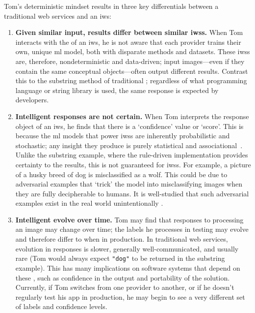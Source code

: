 Tom's deterministic mindset results in three key differentials between a traditional web services and an \gls{iws}:
\begin{enumerate}[label=\textbf{(\arabic*)}]
    \item \textbf{Given similar input, results differ between similar \glspl{iws}.}
    When Tom interacts with the  of an \gls{iws}, he is not aware that each  provider trains their own, unique \gls{ml} model, both with disparate methods and datasets. These \glspl{iws} are, therefore, nondeterministic and data-driven; input images---even if they contain the same conceptual objects---often output different results. Contrast this to the substring method of traditional ; regardless of what programming language or string library is used, the same response is expected by developers.
    \item \textbf{Intelligent responses are not certain.}
    When Tom interprets the response object of an \gls{iws}, he finds that there is a `confidence' value or `score'. This is because the \gls{ml} models that power \glspl{iws} are inherently probabilistic and stochastic; any insight they produce is purely statistical and associational~\citep{Pearl:2018uv}. Unlike the substring example, where the rule-driven implementation provides certainty to the results, this is not guaranteed for \glspl{iws}.
    For example, a picture of a husky breed of dog is misclassified as a wolf. This could be due to adversarial examples \citep{Szegedy:2013vw} that `trick' the model into misclassifying images when they are fully decipherable to humans. It is well-studied that such adversarial examples exist in the real world unintentionally \citep{Kurakin:2016vw,Eykholt:2018vk,Pezzementi:2018tq}.
    \item \textbf{Intelligent  evolve over time.}
    Tom may find that responses to processing an image may change over time; the labels he processes in testing may evolve and therefore differ to when in production. In traditional web services, evolution in responses is slower, generally well-communicated, and usually rare (Tom would always expect \texttt{"dog"} to be returned in the substring example). This has many implications on software systems that depend on these , such as confidence in the output and portability of the solution. Currently, if Tom switches from one  provider to another, or if he doesn't regularly test his app in production, he may begin to see a very different set of labels and confidence levels.
\end{enumerate}

